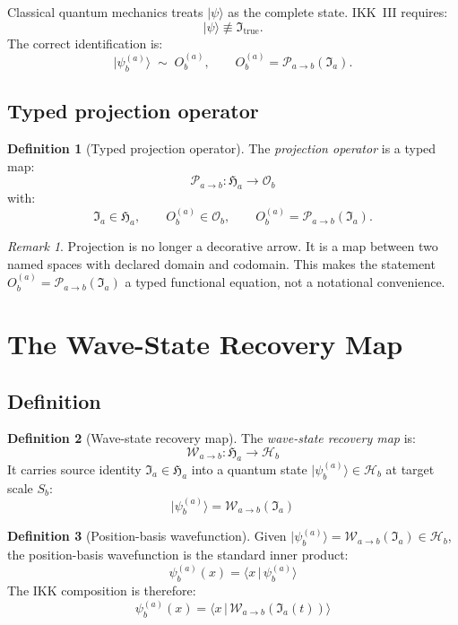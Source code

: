 \documentclass[12pt, a4paper]{article}
\theoremstyle{definition}
\newtheorem{defn}{Definition}[section]
\theoremstyle{plain}
\theoremstyle{remark}
\newtheorem{remark}{Remark}[section]
\newcommand{\Itrue}{\mathfrak{I}_{\mathrm{true}}}
\newcommand{\Ia}{\mathfrak{I}_a}
\newcommand{\Ha}{\mathfrak{H}_a}        %
\newcommand{\Hb}{\mathcal{H}_b}         %
\newcommand{\Osp}{\mathcal{O}_b}        %
\newcommand{\Sb}{S_b}
\newcommand{\Pab}{\mathcal{P}_{a\to b}}
\newcommand{\Wab}{\mathcal{W}_{a\to b}}   %
\newcommand{\Oba}{O_b^{(a)}}
\newcommand{\psiab}{|\psi_b^{(a)}\rangle}
\newcommand{\psix}{\psi_b^{(a)}(x)}
\begin{document}
Classical quantum mechanics treats $|\psi\rangle$ as the complete state.
IKK~III requires:
\[
  |\psi\rangle \not\equiv \Itrue.
\]
The correct identification is:
\[
  |\psi_b^{(a)}\rangle \;\sim\; \Oba,
  \qquad
  \Oba = \Pab(\Ia).
\]

\subsection{Typed projection operator}

\begin{defn}[Typed projection operator]
\label{def:typedproj}
The \emph{projection operator} is a typed map:
\[
  \boxed{\Pab : \Ha \to \Osp}
\]
with:
\[
  \Ia \in \Ha,
  \qquad
  \Oba \in \Osp,
  \qquad
  \Oba = \Pab(\Ia).
\]
\end{defn}

\begin{remark}
Projection is no longer a decorative arrow.
It is a map between two named spaces with declared domain and codomain.
This makes the statement $\Oba = \Pab(\Ia)$ a typed functional equation,
not a notational convenience.
\end{remark}


\section{The Wave-State Recovery Map}
\label{sec:wavemap}

\subsection{Definition}

\begin{defn}[Wave-state recovery map]
\label{def:Wab}
The \emph{wave-state recovery map} is:
\[
  \boxed{\Wab : \Ha \to \Hb}
\]
It carries source identity $\Ia \in \Ha$ into a quantum state
$\psiab \in \Hb$ at target scale $\Sb$:
\[
  \boxed{|\psi_b^{(a)}\rangle = \Wab(\Ia)}
\]
\end{defn}

\begin{defn}[Position-basis wavefunction]
\label{def:psix}
Given $|\psi_b^{(a)}\rangle = \Wab(\Ia) \in \Hb$, the
position-basis wavefunction is the standard inner product:
\[
  \boxed{\psix = \langle x\,|\,\psi_b^{(a)}\rangle}
\]
The IKK composition is therefore:
\[
  \boxed{\psix = \langle x\,|\,\Wab(\Ia(t))\rangle}
\]
\end{defn}
\end{document}

